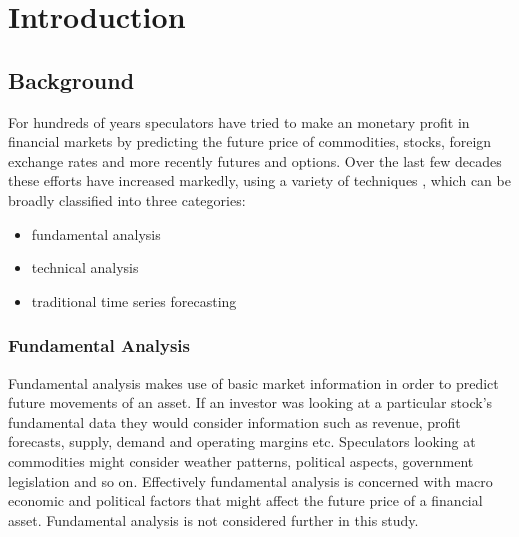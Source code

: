 
\chapter{Introduction} %

\label{Chapter1} %



\section{Background}


For hundreds of years speculators have tried to make an monetary profit in financial markets by predicting the future price of commodities, stocks, foreign exchange rates and more recently futures and options. Over the last few decades these efforts have increased markedly, using a variety of techniques \citep{Hsu201114026}, which can be broadly classified into three categories:

\begin{itemize}
\item fundamental analysis
\item technical analysis
\item traditional time series forecasting
\end{itemize}

\subsection{Fundamental Analysis}
Fundamental analysis makes use of basic market information in order to predict future movements of an asset. If an investor was looking at a particular stock's fundamental data they would consider information such as revenue, profit forecasts, supply, demand and operating margins etc. Speculators looking at commodities might consider weather patterns, political aspects, government legislation and so on. Effectively fundamental analysis is concerned with macro economic and political factors that might affect the future price of a financial asset. Fundamental analysis is not considered further in this study.

